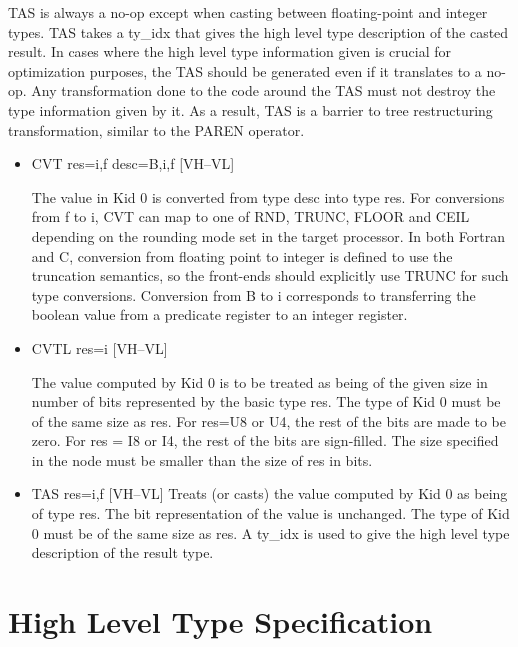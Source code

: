 %
TAS is always a no-op except when casting between floating-point
and integer types.
TAS takes a ty\_idx that gives the high level type description of
the casted result. In cases where the high level type information given
is crucial for optimization purposes, the TAS should be generated
even if it translates to a no-op. Any transformation done to the
code around the TAS must not destroy the type information given by
it. As a result, TAS is a barrier to tree restructuring transformation,
similar to the
%
PAREN operator.

\begin{itemize}
\item
{}%
CVT res=i,f desc=B,i,f \hfill [VH--VL]

The value in Kid 0 is converted from type desc into type res. For
conversions from f to i,
%
CVT can map to one of
%
RND,
%
TRUNC,
%
FLOOR and
%
CEIL depending on the
rounding mode set in the target processor. In both Fortran and C,
conversion from floating point to integer is defined to use
the truncation semantics, so the front-ends should explicitly use
%
TRUNC for such type conversions. Conversion from B to i corresponds
to transferring the boolean value from a predicate register to an
integer register. 

\item
{}%
CVTL res=i \hfill [VH--VL]

The value computed by Kid 0 is to be treated as being of the given
size in number of bits represented by the basic type res. The type
of Kid 0 must
be of the same size as res. For res=U8 or U4, the rest of the bits
are made to be zero. For res = I8 or I4, the rest of the bits are
sign-filled. The size specified in the node must be smaller than
the size of res in bits. \item  TAS res=i,f \hfill [VH--VL]
Treats (or casts) the value computed by Kid 0 as being of type res.
The bit representation of the value is unchanged. The type of Kid
0 must be of
the same size as res. A ty\_idx is used to give the high level type
description of the result type.

\end{itemize}

\section{High Level Type Specification}

